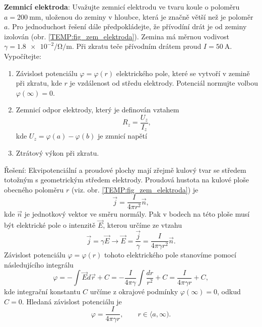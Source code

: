       \begin{example}
        \textbf{Zemnicí elektroda}: Uvažujte zemnicí elektrodu ve tvaru koule o poloměru
        $a=\SI{200}{\mm}$, uloženou do zeminy v hloubce, která je značně větší než je poloměr $a$.
        Pro jednoduchost řešení dále předpokládejte, že přívodíní drát je od zeminy izolován (obr.
        \ref{TEMP:fig_zem_elektroda}). Zemina má měrnou vodivost $\gamma=\num[exponent-product =
        \cdot]{1,8e-2}\si{\per\ohm\per\m}$. Při zkratu teče přívodním drátem proud $I=\SI{50}{\A}$.
        Vypočítejte:

              
        \begin{enumerate}[label=\emph{\alph*})]
          \item Závislost potenciálu $\varphi=\varphi(r)$ elektrického pole, které se vytvoří v
                zemině při zkratu, kde $r$ je vzdálenost od středu elektrody. Potenciál normujte
                volbou $\varphi(\infty)=0$.
          \item Zemnicí odpor elektrody, který je definován vztahem $$R_z=\frac{U_z}{I_z},$$ kde
                $U_z = \varphi(a)-\varphi(b)$ je zmnicí napětí 
          \item Ztrátový výkon při zkratu.            
        \end{enumerate}
        Řešení:    
        Ekvipotenciální a proudové plochy mají zřejmě kulový tvar se středem totožným s
        geometrickým středem elektrody. Proudová hustota na kulové ploše obecného poloměru $r$
        (viz. obr. \ref{TEMP:fig_zem_elektroda}) je $$\vec{j}=\frac{I}{4\pi r^2}\vec{n},$$ kde
        $\vec{n}$ je jednotkový vektor ve směru normály. Pak v bodech na této ploše musí být
        elektrické pole o intenzitě $\vec{E}$, kterou určíme ze vtzahu
        \begin{equation*}
         \vec{j}= \gamma\vec{E}\rightarrow\vec{E}=
                  \frac{\vec{j}}{\gamma}=\frac{I}{4\pi\gamma r^2}\vec{n}.
        \end{equation*}
        Závislost potenciálu $\varphi=\varphi(r)$ tohoto elektrického pole stanovíme pomocí
        následujícího integrálu
        \begin{equation}
          \varphi = - \int\vec{E}d\vec{r}+C = -\frac{I}{4\pi\gamma}\int\frac{dr}{r^2} + C 
                  =   \frac{I}{4\pi\gamma r} + C, \nonumber
        \end{equation} 
        kde integrační konstantu $C$ určíme z okrajové podmínky $\varphi(\infty)=0$, odkud $C=0$.
        Hledaná závislost potenciálu je
        \begin{equation*}
         \varphi = \frac{I}{4\pi\gamma r}, \qquad r\in\langle a, \infty). 
        \end{equation*}           
        

\end{example}
